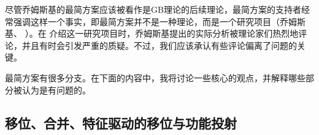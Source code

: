 尽管乔姆斯基的最简方案应该被看作是GB理论的后续理论，最简方案的支持者经常强调这样一个事实，即最简方案并不是一种理论，而是一个研究项目（乔姆斯基\citeyear[]{Chomsky2007a}、
\citeyear[]{Chomsky2013a}）。在 \citet{Chomsky95a-u}介绍这一研究项目时，乔姆斯基提出的实际分析被理论家们热烈地评论，并且有时会引发严重的质疑\citep*{Kolb97a,JL97a-u-platte,JL99a-u-gekauft,LLJ2000b,LLJ2000a,LLJ2001a,Seuren2004a,PJ2005a}。不过，我们应该承认有些评论偏离了问题的关键。

最简方案有很多分支。在下面的内容中，我将讨论一些核心的观点，并解释哪些部分被认为是有问题的。

\subsection{移位、合并、特征驱动的移位与功能投射}
\label{Abschnitt-merkmalsgetriebene-Bewegung}
\label{Abschnitt-MP-funktionale-Projektionen}\label{sec-functional-projections-minimalism}
\label{Abschnitt-Kaynesche-Modelle}

